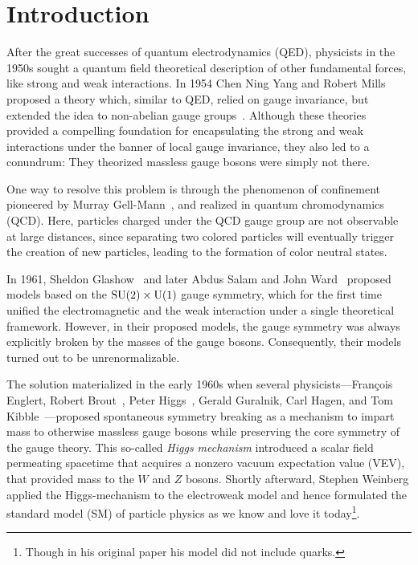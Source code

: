 
\chapter{Introduction}\label{chap:one}

After the great successes of quantum electrodynamics (\acs{QED}), physicists in the 1950s sought a quantum field theoretical description of other fundamental forces, like strong and weak interactions. In 1954 Chen Ning Yang and Robert Mills proposed a theory which, similar to \acs{QED}, relied on gauge invariance, but extended the idea to non-abelian gauge groups~\cite{Yang:1954ek}. Although these theories provided a compelling foundation for encapsulating the strong and weak interactions under the banner of local gauge invariance, they also led to a conundrum: They theorized massless gauge bosons were simply not there.

One way to resolve this problem is through the phenomenon of confinement pioneered by Murray Gell-Mann~\cite{Gell-Mann:1961omu}, and realized in quantum chromodynamics (\acs{QCD}). Here, particles charged under the \acs{QCD} gauge group are not observable at large distances, since separating two colored particles will eventually trigger the creation of new particles, leading to the formation of color neutral states.

In 1961, Sheldon Glashow~\cite{Glashow:1961tr} and later Abdus Salam and John Ward~\cite{Salam:1964ry} proposed models based on the $\mathrm{SU}(2)\times \mathrm{U}(1)$ gauge symmetry, which for the first time unified the electromagnetic and the weak interaction under a single theoretical framework. However, in their proposed models, the gauge symmetry was always explicitly broken by the masses of the gauge bosons. Consequently, their models turned out to be unrenormalizable.

The solution materialized in the early 1960s when several physicists---François Englert, Robert Brout~\cite{Englert:1964et}, Peter Higgs~\cite{Higgs:1966ev}, Gerald Guralnik, Carl Hagen, and Tom Kibble~\cite{Guralnik:1964eu}---proposed spontaneous symmetry breaking as a mechanism to impart mass to otherwise massless gauge bosons while preserving the core symmetry of the gauge theory. This so-called \textit{Higgs mechanism} introduced a scalar field permeating spacetime that acquires a nonzero vacuum expectation value (\acs{VEV}), that provided mass to the $W$ and $Z$ bosons. Shortly afterward, Stephen Weinberg applied the Higgs-mechanism to the electroweak model and hence formulated the standard model (\acs{SM}) of particle physics as we know and love it today\footnote{Though in his original paper his model did not include quarks.}.

